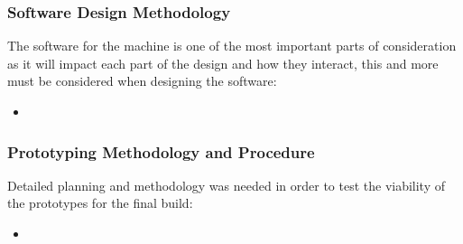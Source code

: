 \documentclass[a4paper,11pt]{article}
\begin{document}
\subsubsection{Software Design Methodology}
The software for the machine is one of the most important parts of consideration as it will impact each part of the design and how they interact, this and more must be considered when designing the software:
\begin{itemize}
	\item 	 
\end{itemize}

\subsubsection{Prototyping Methodology and Procedure }
Detailed planning and methodology was needed in order to test the viability of the prototypes for the final build:
\begin{itemize}
	\item 	 
\end{itemize}


\end{document}
